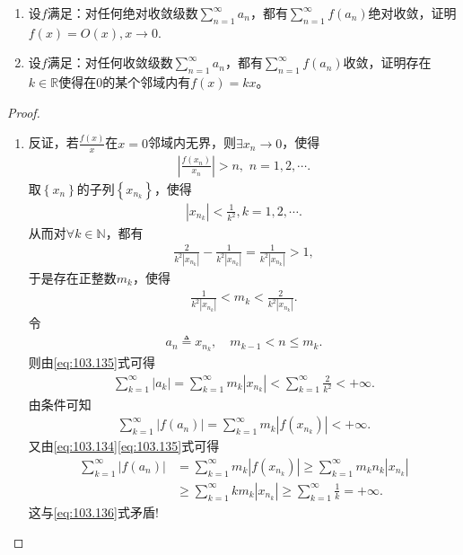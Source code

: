 \documentclass[../../main.tex]{subfiles}
\begin{document}
\begin{example}
\begin{enumerate}
\item 设$f$满足：对任何绝对收敛级数$\sum_{n=1}^{\infty} a_n$，都有$\sum_{n=1}^{\infty} f(a_n)$绝对收敛，证明$f(x) = O(x),x\to 0$.

\item 设$f$满足：对任何收敛级数$\sum_{n=1}^{\infty} a_n$，都有$\sum_{n=1}^{\infty} f(a_n)$收敛，证明存在$k \in \mathbb{R}$使得在0的某个邻域内有$f(x) = kx$。
\end{enumerate}
\end{example}
\begin{proof}
\begin{enumerate}
\item 反证，若$\frac{f\left( x \right)}{x}$在$x=0$邻域内无界，则$\exists x_n\rightarrow 0$，使得
\begin{align}
\left| \frac{f\left( x_n \right)}{x_n} \right|>n,\,\,n=1,2,\cdots .
\label{eq:103.134}
\end{align}
取$\left\{ x_n \right\}$的子列$\left\{ x_{n_k} \right\}$，使得
\begin{align*}
\left| x_{n_k} \right|<\frac{1}{k^2},k=1,2,\cdots .
\end{align*}
从而对$\forall k\in \mathbb{N}$，都有
\begin{align*}
\frac{2}{k^2\left| x_{n_k} \right|}-\frac{1}{k^2\left| x_{n_k} \right|}=\frac{1}{k^2\left| x_{n_k} \right|}>1,
\end{align*}
于是存在正整数$m_k$，使得
\begin{align}
\frac{1}{k^2\left| x_{n_k} \right|}<m_k<\frac{2}{k^2\left| x_{n_k} \right|}.
\label{eq:103.135}
\end{align}
令
\begin{align*}
a_n\triangleq x_{n_k},\quad m_{k-1}<n\leqslant m_k.
\end{align*}
则由\eqref{eq:103.135}式可得
\begin{align*}
\sum_{k=1}^{\infty}{\left| a_k \right|}=\sum_{k=1}^{\infty}{m_k\left| x_{n_k} \right|}<\sum_{k=1}^{\infty}{\frac{2}{k^2}}<+\infty .
\end{align*}
由条件可知
\begin{align}
\sum_{k=1}^{\infty}{\left| f\left( a_n \right) \right|}=\sum_{k=1}^{\infty}{m_k\left| f\left( x_{n_k} \right) \right|}<+\infty .
\label{eq:103.136}
\end{align}
又由\eqref{eq:103.134}\eqref{eq:103.135}式可得
\begin{align*}
\sum_{k=1}^{\infty}{\left| f\left( a_n \right) \right|}&=\sum_{k=1}^{\infty}{m_k\left| f\left( x_{n_k} \right) \right|}\geqslant \sum_{k=1}^{\infty}{m_kn_k\left| x_{n_k} \right|}\\
&\geqslant \sum_{k=1}^{\infty}{km_k\left| x_{n_k} \right|}\geqslant \sum_{k=1}^{\infty}{\frac{1}{k}}=+\infty .
\end{align*}
这与\eqref{eq:103.136}式矛盾!


\end{enumerate}
\end{proof}
\end{document}
